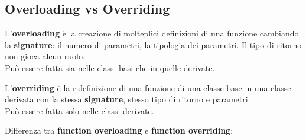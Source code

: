 \subsection{Overloading vs Overriding}

\textsf{\small L'\textbf{overloading} è la creazione di molteplici definizioni di una funzione cambiando la \textbf{signature}: il numero di parametri, la tipologia dei parametri. Il tipo di ritorno non gioca alcun ruolo.} \\

\textsf{\small Può essere fatta sia nelle classi basi che in quelle derivate.} \break

\textsf{\small L'\textbf{overriding} è la ridefinizione di una funzione di una classe base in una classe derivata con la stessa \textbf{signature}, stesso tipo di ritorno e parametri.} \\

\textsf{\small Può essere fatta solo nelle classi derivate.} \break

\textsf{\small Differenza tra \textbf{function overloading} e \textbf{function overriding}: } \break

